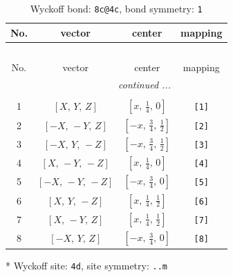 \documentclass[fleqn,8pt]{jsarticle}
\begin{document}
\begin{longtable}{cccc}
\caption{Wyckoff bond: {\tt 8c@4c}, bond symmetry: {\tt 1}}
 \\
 \hline \hline
No. & vector & center & mapping \\ \hline \endfirsthead

\multicolumn{3}{l}{\tablename\ \thetable{}} \\
 \hline \hline
No. & vector & center & mapping \\ \hline \endhead

 \hline \hline
\multicolumn{3}{r}{\footnotesize\it continued ...} \\ \endfoot

 \hline \hline
\multicolumn{3}{r}{} \\ \endlastfoot

1 & $\left[ X,\, Y,\, Z \right]$ & $\left[ x,\, \frac{1}{4},\, 0 \right]$ & {\tt [1]} \\ \hline
2 & $\left[ - X,\, - Y,\, Z \right]$ & $\left[ - x,\, \frac{3}{4},\, \frac{1}{2} \right]$ & {\tt [2]} \\ \hline
3 & $\left[ - X,\, Y,\, - Z \right]$ & $\left[ - x,\, \frac{3}{4},\, \frac{1}{2} \right]$ & {\tt [3]} \\ \hline
4 & $\left[ X,\, - Y,\, - Z \right]$ & $\left[ x,\, \frac{1}{4},\, 0 \right]$ & {\tt [4]} \\ \hline
5 & $\left[ - X,\, - Y,\, - Z \right]$ & $\left[ - x,\, \frac{3}{4},\, 0 \right]$ & {\tt [5]} \\ \hline
6 & $\left[ X,\, Y,\, - Z \right]$ & $\left[ x,\, \frac{1}{4},\, \frac{1}{2} \right]$ & {\tt [6]} \\ \hline
7 & $\left[ X,\, - Y,\, Z \right]$ & $\left[ x,\, \frac{1}{4},\, \frac{1}{2} \right]$ & {\tt [7]} \\ \hline
8 & $\left[ - X,\, Y,\, Z \right]$ & $\left[ - x,\, \frac{3}{4},\, 0 \right]$ & {\tt [8]} \\
\end{longtable}
* Wyckoff site: {\tt 4d}, site symmetry: {\tt ..m}
\renewcommand{\arraystretch}{1.2}
\end{document}
